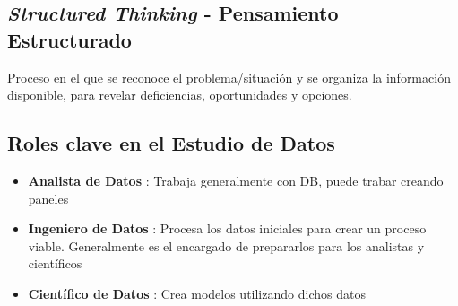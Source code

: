 \subsection{\textit{Structured Thinking} - Pensamiento Estructurado}
Proceso en el que se reconoce el problema/situación y se organiza la información disponible, para revelar deficiencias, oportunidades y opciones.

\subsection{Roles clave en el Estudio de Datos}
\begin{itemize}
    \item {\textbf{Analista de Datos} : Trabaja generalmente con DB, puede trabar creando paneles}
    \item {\textbf{Ingeniero de Datos} : Procesa los datos iniciales para crear un proceso viable. Generalmente es el encargado de prepararlos para los analistas y científicos}
    \item {\textbf{Científico de Datos} : Crea modelos utilizando dichos datos}
\end{itemize}

\newpage